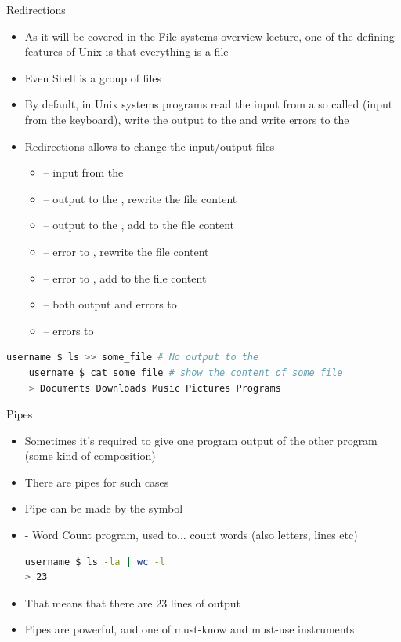 \documentclass[usenames,dvipsnames,10pt,aspectratio=169]{beamer}
\begin{document}
\begin{frame}[fragile]{Redirections}
    \begin{itemize}
        \item As it will be covered in the File systems overview lecture, one of the defining features of Unix is that everything is a file
        \item Even Shell is a group of files
        \item By default, in Unix systems programs read the input from a so called  (input from the keyboard), write the output to the  and write errors to the 
        \item Redirections allows to change the input/output files
        \begin{itemize}
            \item {} -- input from the 
            \item {} -- output to the , rewrite the file content
            \item {} -- output to the , add to the file content
            \item {} -- error to , rewrite the file content
            \item {} -- error to , add to the file content
            \item {} -- both output and errors to 
            \item {} -- errors to 
        \end{itemize}
    \end{itemize}
    \begin{lstlisting}[language=Bash, style=shellstyle]
    username $ ls >> some_file # No output to the 
    username $ cat some_file # show the content of some_file
    > Documents Downloads Music Pictures Programs \end{lstlisting}
\end{frame}

\begin{frame}[fragile]{Pipes}
    \begin{itemize}
        \item Sometimes it's required to give one program output of the other program (some kind of composition)
        \item There are pipes for such cases
        \item Pipe can be made by the \ex{|} symbol
        \item {} - Word Count program, used to... count words (also letters, lines etc)
        \begin{lstlisting}[language=Bash, style=shellstyle] 
username $ ls -la | wc -l
> 23 
\end{lstlisting}
        \item That means that there are 23 lines of output
        \item Pipes are powerful, and one of must-know and must-use instruments
    \end{itemize}
\end{frame}
\end{document}
